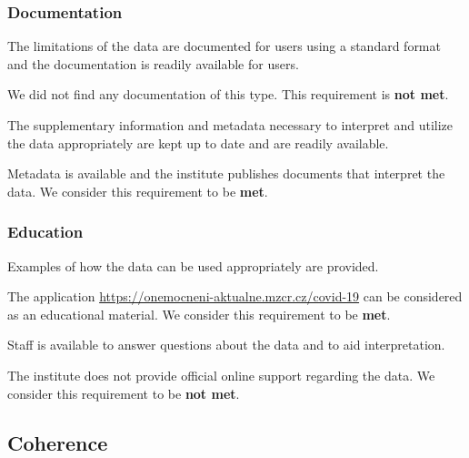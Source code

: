 \subsubsection{Documentation}

\begin{QandA}
    \item The limitations of the data are documented for users using a standard format and the documentation is readily available for users.
    \begin{answered}
        We did not find any documentation of this type.
        This requirement is \textbf{not met}.
    \end{answered}

    \item The supplementary information and metadata necessary to interpret and utilize the data appropriately are kept up to date and are readily available.
    \begin{answered}
        Metadata is available and the institute publishes documents that interpret the data.
        We consider this requirement to be \textbf{met}.
    \end{answered}

\end{QandA}

\subsubsection{Education}

\begin{QandA}
    \item Examples of how the data can be used appropriately are provided.
    \begin{answered}
        The application \url{https://onemocneni-aktualne.mzcr.cz/covid-19} can be considered as an educational material.
        We consider this requirement to be \textbf{met}.
    \end{answered}

    \item Staff is available to answer questions about the data and to aid interpretation.
    \begin{answered}
        The institute does not provide official online support regarding the data.
        We consider this requirement to be \textbf{not met}.
    \end{answered}

\end{QandA}

\subsection{Coherence}

